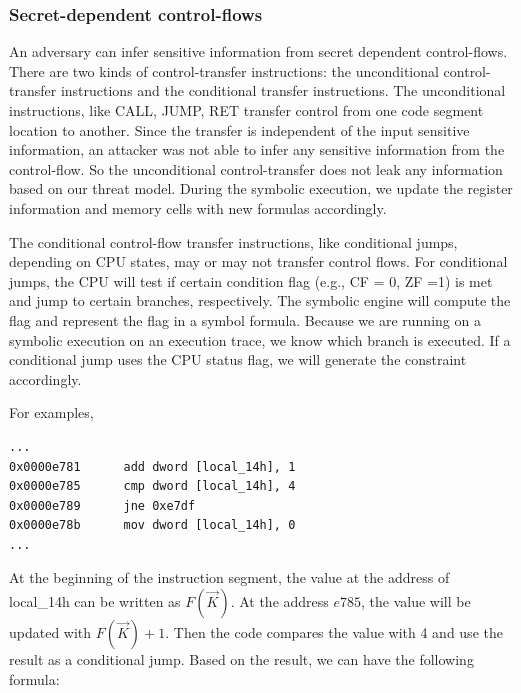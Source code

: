 \subsubsection{Secret-dependent control-flows}
An adversary can infer sensitive information from secret dependent control-flows. 
There are two kinds of control-transfer instructions: the unconditional 
control-transfer instructions and the conditional transfer instructions.
The unconditional instructions, like CALL, JUMP, RET transfer control
from one code segment location to another. Since the transfer is independent of the input sensitive information, an attacker was not able to infer any sensitive information from the control-flow. 
So the unconditional control-transfer does not leak any information based on our threat model. During the symbolic execution, 
we update the register information and memory cells with new formulas accordingly.

The conditional control-flow transfer instructions, like conditional jumps,
depending on CPU states, may or may not transfer control flows.
For conditional jumps, the CPU will test if certain condition flag 
(e.g., CF = 0, ZF =1) is met and jump to certain branches, respectively.
The symbolic engine will compute the flag and represent the flag in a symbol 
formula. Because we are running on a symbolic execution on an execution trace, 
we know which branch is executed.
If a conditional jump uses the CPU status flag, we will generate the constraint 
accordingly.



For examples,

\begin{lstlisting}
...
0x0000e781      add dword [local_14h], 1
0x0000e785      cmp dword [local_14h], 4
0x0000e789      jne 0xe7df
0x0000e78b      mov dword [local_14h], 0
...
\end{lstlisting}

At the beginning of the instruction segment, the value at the 
address of local\_14h can be written as $F(\vec{K})$. At the address $e785$, 
the value will be updated with $F(\vec{K})+1$. Then the code compares 
the value with 4 and use the result as a conditional jump. 
Based on the result, we can have the following formula:

